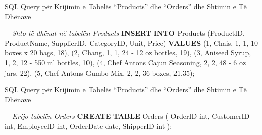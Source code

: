 \documentclass[
  ignorenonframetext,
]{beamer}
\newenvironment{Shaded}{\begin{snugshade}}{\end{snugshade}}
\newcommand{\CharTok}[1]{\textcolor[rgb]{0.31,0.60,0.02}{#1}}
\newcommand{\CommentTok}[1]{\textcolor[rgb]{0.56,0.35,0.01}{\textit{#1}}}
\newcommand{\DataTypeTok}[1]{\textcolor[rgb]{0.13,0.29,0.53}{#1}}
\newcommand{\DecValTok}[1]{\textcolor[rgb]{0.00,0.00,0.81}{#1}}
\newcommand{\FloatTok}[1]{\textcolor[rgb]{0.00,0.00,0.81}{#1}}
\newcommand{\KeywordTok}[1]{\textcolor[rgb]{0.13,0.29,0.53}{\textbf{#1}}}
\newcommand{\NormalTok}[1]{#1}
\newcommand{\StringTok}[1]{\textcolor[rgb]{0.31,0.60,0.02}{#1}}
\begin{document}
\begin{frame}[fragile]{SQL Query për Krijimin e Tabelës ``Products'' dhe
``Orders'' dhe Shtimin e Të Dhënave}
\label{sql-query-puxebr-krijimin-e-tabeluxebs-products-dhe-orders-dhe-shtimin-e-tuxeb-dhuxebnave-1}

\begin{Shaded}
\begin{Highlighting}[]
\CommentTok{{-}{-} Shto të dhënat në tabelën Products}
\KeywordTok{INSERT} \KeywordTok{INTO}\NormalTok{ Products (ProductID, ProductName, SupplierID, CategoryID, Unit, Price) }\KeywordTok{VALUES}
\NormalTok{(}\DecValTok{1}\NormalTok{, }\StringTok{\textquotesingle{}Chais\textquotesingle{}}\NormalTok{, }\DecValTok{1}\NormalTok{, }\DecValTok{1}\NormalTok{, }\StringTok{\textquotesingle{}10 boxes x 20 bags\textquotesingle{}}\NormalTok{, }\DecValTok{18}\NormalTok{),}
\NormalTok{(}\DecValTok{2}\NormalTok{, }\StringTok{\textquotesingle{}Chang\textquotesingle{}}\NormalTok{, }\DecValTok{1}\NormalTok{, }\DecValTok{1}\NormalTok{, }\StringTok{\textquotesingle{}24 {-} 12 oz bottles\textquotesingle{}}\NormalTok{, }\DecValTok{19}\NormalTok{),}
\NormalTok{(}\DecValTok{3}\NormalTok{, }\StringTok{\textquotesingle{}Aniseed Syrup\textquotesingle{}}\NormalTok{, }\DecValTok{1}\NormalTok{, }\DecValTok{2}\NormalTok{, }\StringTok{\textquotesingle{}12 {-} 550 ml bottles\textquotesingle{}}\NormalTok{, }\DecValTok{10}\NormalTok{),}
\NormalTok{(}\DecValTok{4}\NormalTok{, }\StringTok{\textquotesingle{}Chef Anton}\CharTok{\textquotesingle{}\textquotesingle{}}\StringTok{s Cajun Seasoning\textquotesingle{}}\NormalTok{, }\DecValTok{2}\NormalTok{, }\DecValTok{2}\NormalTok{, }\StringTok{\textquotesingle{}48 {-} 6 oz jars\textquotesingle{}}\NormalTok{, }\DecValTok{22}\NormalTok{),}
\NormalTok{(}\DecValTok{5}\NormalTok{, }\StringTok{\textquotesingle{}Chef Anton}\CharTok{\textquotesingle{}\textquotesingle{}}\StringTok{s Gumbo Mix\textquotesingle{}}\NormalTok{, }\DecValTok{2}\NormalTok{, }\DecValTok{2}\NormalTok{, }\StringTok{\textquotesingle{}36 boxes\textquotesingle{}}\NormalTok{, }\FloatTok{21.35}\NormalTok{);}
\end{Highlighting}
\end{Shaded}
\end{frame}

\begin{frame}[fragile]{SQL Query për Krijimin e Tabelës ``Products'' dhe
``Orders'' dhe Shtimin e Të Dhënave}
\label{sql-query-puxebr-krijimin-e-tabeluxebs-products-dhe-orders-dhe-shtimin-e-tuxeb-dhuxebnave-2}
\begin{Shaded}
\begin{Highlighting}[]
\CommentTok{{-}{-} Krijo tabelën Orders}
\KeywordTok{CREATE} \KeywordTok{TABLE}\NormalTok{ Orders (}
\NormalTok{    OrderID }\DataTypeTok{int}\NormalTok{,}
\NormalTok{    CustomerID }\DataTypeTok{int}\NormalTok{,}
\NormalTok{    EmployeeID }\DataTypeTok{int}\NormalTok{,}
\NormalTok{    OrderDate }\DataTypeTok{date}\NormalTok{,}
\NormalTok{    ShipperID }\DataTypeTok{int}
\NormalTok{);}
\end{Highlighting}
\end{Shaded}
\end{frame}
\end{document}
